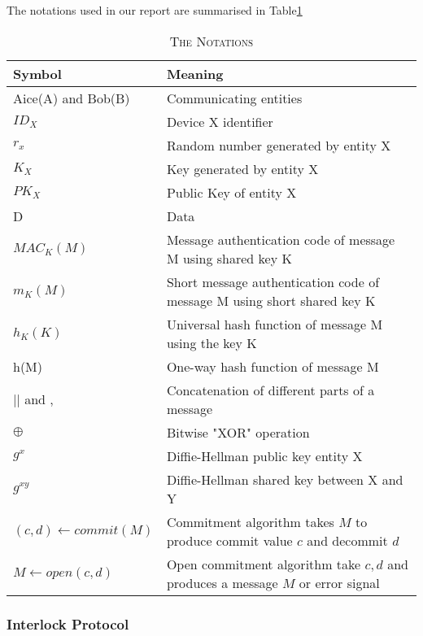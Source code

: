 The notations used in our report are summarised in Table\ref{notation}

\begin{table}[ht] 
\centering
\caption{\textsc{The Notations}}
\label{notation}
{\scriptsize
\begin{tabular}{|p{5cm} | p{10cm} |}
\hline
\textbf{Symbol} & \textbf{Meaning} \\ \hline 
Aice(A) and Bob(B) & Communicating entities \\ 
$ID_X$ & Device X identifier \\ 
$r_x$ & Random number generated by entity X \\
$K_X$ & Key generated by entity X \\
$PK_X$ & Public Key of entity X \\ 
D & Data \\ 
$MAC_K(M)$ & Message authentication code of message M using shared key K \\ 
$m_K(M)$ & Short message authentication code of message M using short shared key K \\
$h_K(K)$ & Universal hash function of message M using the key K \\ 
h(M) & One-way hash function of message M \\ 
$||$ and , & Concatenation of different parts of a message\\ 
$\oplus$ & Bitwise "XOR" operation \\ 
$g^x$ & Diffie-Hellman public key entity X \\ 
$g^{xy}$ & Diffie-Hellman shared key between X and Y \\ 
$(c,d) \leftarrow commit(M)$ & Commitment algorithm takes $M$ to produce commit value $c$ and decommit $d$ \\ 
$M \leftarrow open(c,d)$ & Open commitment algorithm take $c,d$ and produces a message $M$ or error signal \\ \hline 

\end{tabular}
}
\end{table}

\subsubsection{Interlock Protocol}

